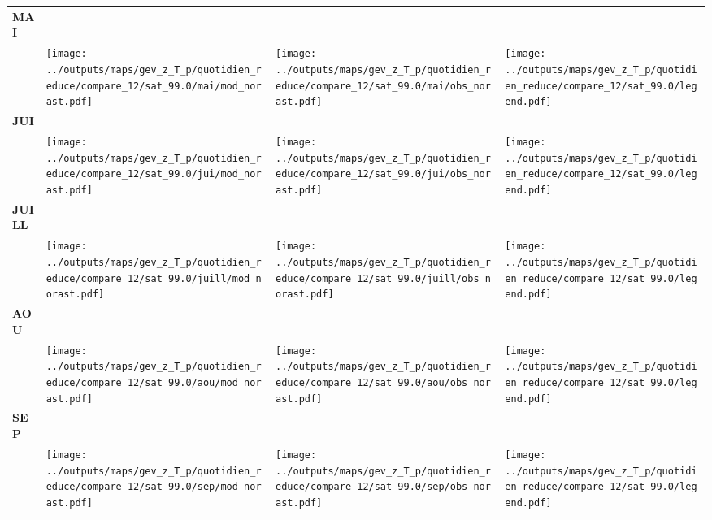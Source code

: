 \documentclass[
  letterpaper,
  DIV=11,
  numbers=noendperiod]{scrartcl}
\begin{document}
\begin{longtable*}{m{2.0cm}m{7.9cm}m{7.9cm}m{1cm}}
\centering \textbf{MAI} \\[0.2em] \begin{tabular}{r@{\hspace{0.2em}}l}\end{tabular} & \centering \texttt{[image: ../outputs/maps/gev\_z\_T\_p/quotidien\_reduce/compare\_12/sat\_99.0/mai/mod\_norast.pdf]} & \centering \texttt{[image: ../outputs/maps/gev\_z\_T\_p/quotidien\_reduce/compare\_12/sat\_99.0/mai/obs\_norast.pdf]} & \centering \texttt{[image: ../outputs/maps/gev\_z\_T\_p/quotidien\_reduce/compare\_12/sat\_99.0/legend.pdf]} \tabularnewline
\centering \textbf{JUI} \\[0.2em] \begin{tabular}{r@{\hspace{0.2em}}l}\end{tabular} & \centering \texttt{[image: ../outputs/maps/gev\_z\_T\_p/quotidien\_reduce/compare\_12/sat\_99.0/jui/mod\_norast.pdf]} & \centering \texttt{[image: ../outputs/maps/gev\_z\_T\_p/quotidien\_reduce/compare\_12/sat\_99.0/jui/obs\_norast.pdf]} & \centering \texttt{[image: ../outputs/maps/gev\_z\_T\_p/quotidien\_reduce/compare\_12/sat\_99.0/legend.pdf]} \tabularnewline
\centering \textbf{JUILL} \\[0.2em] \begin{tabular}{r@{\hspace{0.2em}}l}\end{tabular} & \centering \texttt{[image: ../outputs/maps/gev\_z\_T\_p/quotidien\_reduce/compare\_12/sat\_99.0/juill/mod\_norast.pdf]} & \centering \texttt{[image: ../outputs/maps/gev\_z\_T\_p/quotidien\_reduce/compare\_12/sat\_99.0/juill/obs\_norast.pdf]} & \centering \texttt{[image: ../outputs/maps/gev\_z\_T\_p/quotidien\_reduce/compare\_12/sat\_99.0/legend.pdf]} \tabularnewline
\centering \textbf{AOU} \\[0.2em] \begin{tabular}{r@{\hspace{0.2em}}l}\end{tabular} & \centering \texttt{[image: ../outputs/maps/gev\_z\_T\_p/quotidien\_reduce/compare\_12/sat\_99.0/aou/mod\_norast.pdf]} & \centering \texttt{[image: ../outputs/maps/gev\_z\_T\_p/quotidien\_reduce/compare\_12/sat\_99.0/aou/obs\_norast.pdf]} & \centering \texttt{[image: ../outputs/maps/gev\_z\_T\_p/quotidien\_reduce/compare\_12/sat\_99.0/legend.pdf]} \tabularnewline
\centering \textbf{SEP} \\[0.2em] \begin{tabular}{r@{\hspace{0.2em}}l}\end{tabular} & \centering \texttt{[image: ../outputs/maps/gev\_z\_T\_p/quotidien\_reduce/compare\_12/sat\_99.0/sep/mod\_norast.pdf]} & \centering \texttt{[image: ../outputs/maps/gev\_z\_T\_p/quotidien\_reduce/compare\_12/sat\_99.0/sep/obs\_norast.pdf]} & \centering \texttt{[image: ../outputs/maps/gev\_z\_T\_p/quotidien\_reduce/compare\_12/sat\_99.0/legend.pdf]} \tabularnewline

\end{longtable*}
\end{document}
